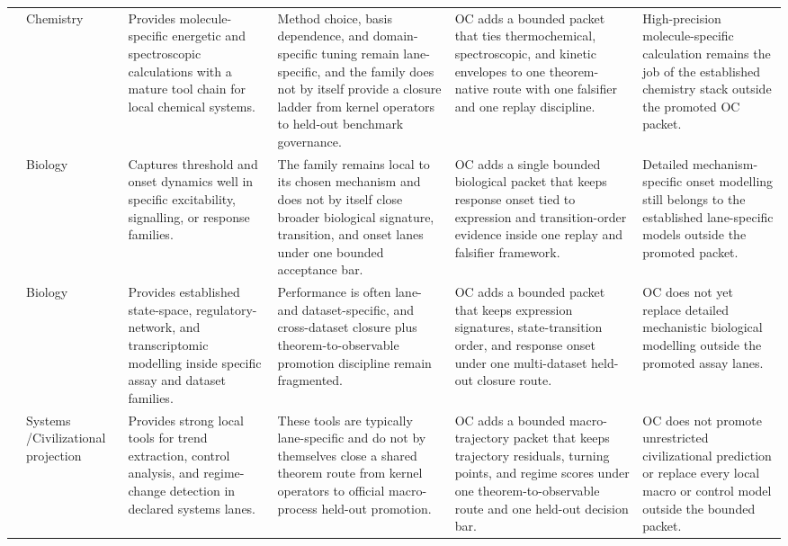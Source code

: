 \begin{longtable}{@{}L{0.17\textwidth}L{0.09\textwidth}L{0.17\textwidth}L{0.17\textwidth}L{0.20\textwidth}L{0.14\textwidth}@{}}
 & Chemistry & Provides molecule-specific energetic and spectroscopic calculations with a mature tool chain for local chemical systems. & Method choice, basis dependence, and domain-specific tuning remain lane-specific, and the family does not by itself provide a closure ladder from kernel operators to held-out benchmark governance. & OC adds a bounded packet that ties thermochemical, spectroscopic, and kinetic envelopes to one theorem-native route with one falsifier and one replay discipline. & High-precision molecule-specific calculation remains the job of the established chemistry stack outside the promoted OC packet. \\
 & Biology & Captures threshold and onset dynamics well in specific excitability, signalling, or response families. & The family remains local to its chosen mechanism and does not by itself close broader biological signature, transition, and onset lanes under one bounded acceptance bar. & OC adds a single bounded biological packet that keeps response onset tied to expression and transition-order evidence inside one replay and falsifier framework. & Detailed mechanism-specific onset modelling still belongs to the established lane-specific models outside the promoted packet. \\
 & Biology & Provides established state-space, regulatory-network, and transcriptomic modelling inside specific assay and dataset families. & Performance is often lane- and dataset-specific, and cross-dataset closure plus theorem-to-observable promotion discipline remain fragmented. & OC adds a bounded packet that keeps expression signatures, state-transition order, and response onset under one multi-dataset held-out closure route. & OC does not yet replace detailed mechanistic biological modelling outside the promoted assay lanes. \\
 & Systems /\allowbreak Civili\allowbreak{}zational\allowbreak{} projection & Provides strong local tools for trend extraction, control analysis, and regime-change detection in declared systems lanes. & These tools are typically lane-specific and do not by themselves close a shared theorem route from kernel operators to official macro-process held-out promotion. & OC adds a bounded macro-trajectory packet that keeps trajectory residuals, turning points, and regime scores under one theorem-to-observable route and one held-out decision bar. & OC does not promote unrestricted civilizational prediction or replace every local macro or control model outside the bounded packet. \\

\end{longtable}

